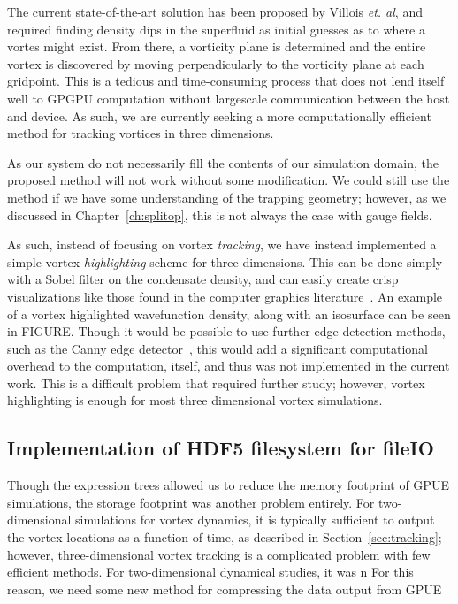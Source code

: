 The current state-of-the-art solution has been proposed by Villois \textit{et. al}, and required finding density dips in the superfluid as initial guesses as to where a vortes might exist.
From there, a vorticity plane is determined and the entire vortex is discovered by moving perpendicularly to the vorticity plane at each gridpoint.
This is a tedious and time-consuming process that does not lend itself well to GPGPU computation without largescale communication between the host and device.
As such, we are currently seeking a more computationally efficient method for tracking vortices in three dimensions.

As our system do not necessarily fill the contents of our simulation domain, the proposed method will not work without some modification.
We could still use the method if we have some understanding of the trapping geometry; however, as we discussed in Chapter~\ref{ch:splitop}, this is not always the case with gauge fields.

As such, instead of focusing on vortex \textit{tracking}, we have instead implemented a simple vortex \textit{highlighting} scheme for three dimensions.
This can be done simply with a Sobel filter on the condensate density, and can easily create crisp visualizations like those found in the computer graphics literature~\cite{guo2018}.
An example of a vortex highlighted wavefunction density, along with an isosurface can be seen in FIGURE.
Though it would be possible to use further edge detection methods, such as the Canny edge detector~\cite{canny1986}, this would add a significant computational overhead to the computation, itself, and thus was not implemented in the current work.
This is a difficult problem that required further study; however, vortex highlighting is enough for most three dimensional vortex simulations.

\subsection{Implementation of HDF5 filesystem for fileIO}

Though the expression trees allowed us to reduce the memory footprint of GPUE simulations, the storage footprint was another problem entirely.
For two-dimensional simulations for vortex dynamics, it is typically sufficient to output the vortex locations as a function of time, as described in Section~\ref{sec:tracking}; however, three-dimensional vortex tracking is a complicated problem with few efficient methods.
For two-dimensional dynamical studies, it was n
For this reason, we need some new method for compressing the data output from GPUE


